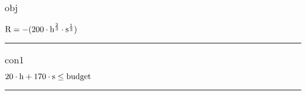 \documentclass[11pt]{article}
\begin{document}
\subsubsection*{$\text{obj}$} \label{obj}
$
\textcolor{black}{\text{R}} = - ( 200 \cdot  {\textcolor{black}{\text{h}}}^{ \frac{2}{3} } \cdot  {\textcolor{black}{\text{s}}}^{ \frac{1}{3} } ) 
$ \vspace{5pt}
\hrule 
\subsubsection*{$\text{con1}$} \label{con1}
$
20 \cdot \textcolor{black}{\text{h}} + 170 \cdot \textcolor{black}{\text{s}} \leq \textcolor{black}{\text{budget}}
$ \vspace{5pt}
\hrule 
\bigskip

\bigskip
\end{document}
